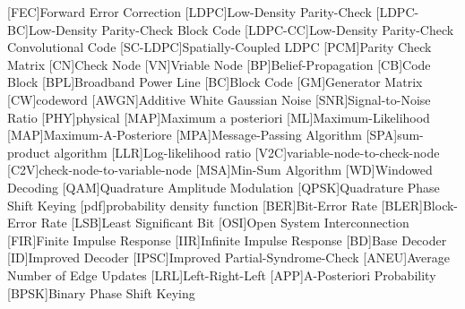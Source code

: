 \begin{acronym}
  [FEC]{Forward Error Correction}
  [LDPC]{Low-Density Parity-Check}
  [LDPC-BC]{Low-Density Parity-Check Block Code}
  [LDPC-CC]{Low-Density Parity-Check Convolutional Code}
  [SC-LDPC]{Spatially-Coupled LDPC}
  [PCM]{Parity Check Matrix}
  [CN]{Check Node}
  [VN]{Vriable Node}
  [BP]{Belief-Propagation}
  [CB]{Code Block}
  [BPL]{Broadband Power Line}
  [BC]{Block Code}
  [GM]{Generator Matrix}
  [CW]{codeword}
  [AWGN]{Additive White Gaussian Noise}
  [SNR]{Signal-to-Noise Ratio}
  [PHY]{physical}
  [MAP]{Maximum a posteriori}
  [ML]{Maximum-Likelihood}
  [MAP]{Maximum-A-Posteriore}
  [MPA]{Message-Passing Algorithm}
  [SPA]{sum-product algorithm}
  [LLR]{Log-likelihood ratio}
  [V2C]{variable-node-to-check-node}
  [C2V]{check-node-to-variable-node}
  [MSA]{Min-Sum Algorithm}
  [WD]{Windowed Decoding}
  [QAM]{Quadrature Amplitude Modulation}
  [QPSK]{Quadrature Phase Shift Keying}
  [pdf]{probability density function}
  [BER]{Bit-Error Rate}
  [BLER]{Block-Error Rate}
  [LSB]{Least Significant Bit}
  [OSI]{Open System Interconnection}
  [FIR]{Finite Impulse Response}
  [IIR]{Infinite Impulse Response}
  [BD]{Base Decoder}
  [ID]{Improved Decoder}
  [IPSC]{Improved Partial-Syndrome-Check}
  [ANEU]{Average Number of Edge Updates}
  [LRL]{Left-Right-Left}
  [APP]{A-Posteriori Probability}
  [BPSK]{Binary Phase Shift Keying}
\end{acronym}